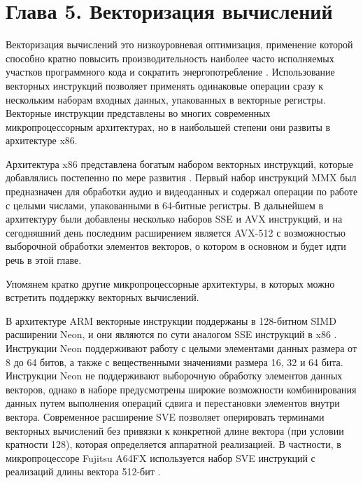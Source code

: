 \newpage
\section*{Глава 5. Векторизация вычислений} %
\addtocounter{section}{1}                                                    %
\setcounter{subsection}{0}
\setcounter{figure}{0}
\setcounter{equation}{0}
\setcounter{table}{0}
\setcounter{theorem}{0}
\setcounter{lemma}{0}
\setcounter{definition}{0}

Векторизация вычислений это низкоуровневая оптимизация, применение которой способно кратно повысить производительность наиболее часто исполняемых участков программного кода и сократить энергопотребление \cite{Cebrian2019VecScal}.
Использование векторных инструкций позволяет применять одинаковые операции сразу к нескольким наборам входных данных, упакованных в векторные регистры.
Векторные инструкции представлены во многих современных микропроцессорным архитектурах, но в наибольшей степени они развиты в архитектуре x86.

Архитектура x86 представлена богатым набором векторных инструкций, которые добавлялись постепенно по мере развития \cite{IntelSDM2025}.
Первый набор инструкций MMX\label{abbr:mmx-1} был предназначен для обработки аудио и видеоданных и содержал операции по работе с целыми числами, упакованными в 64-битные регистры.
В дальнейшем в архитектуру были добавлены несколько наборов SSE\label{abbr:sse-1} и AVX\label{abbr:avx-2} инструкций, и на сегодняшний день последним расширением является AVX-512 с возможностью выборочной обработки элементов векторов, о котором в основном и будет идти речь в этой главе.

Упомянем кратко другие микропроцессорные архитектуры, в которых можно встретить поддержку векторных вычислений.

В архитектуре ARM\label{abbr:arm-1} векторные инструкции поддержаны в 128-битном SIMD\label{abbr:simd-1} расширении Neon, и они являются по сути аналогом SSE инструкций в x86 \cite{Zhuykov2012VecARM,Marquez2020VecARM}.
Инструкции Neon поддерживают работу с целыми элементами данных размера от 8 до 64 битов, а также с вещественными значениями размера 16, 32 и 64 бита.
Инструкции Neon не поддерживают выборочную обработку элементов данных векторов, однако в наборе предусмотрены широкие возможности комбинирования данных путем выполнения операций сдвига и перестановки элементов внутри вектора.
Современное расширение SVE\label{abbr:sve-1} \cite{Stephens2017VecARM} позволяет оперировать терминами векторных вычислений без привязки к конкретной длине вектора (при условии кратности 128), которая определяется аппаратной реализацией.
В частности, в микропроцессоре Fujitsu A64FX используется набор SVE инструкций с реализаций длины вектора 512-бит \cite{Okazaki2020A64FX}.

